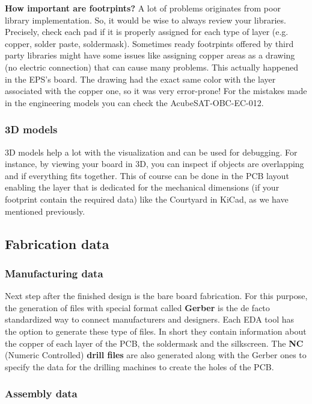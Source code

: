 \documentclass[final]{cubedoc}
\begin{document}
	
	
	\textbf{How important are footrpints?}
	A lot of problems originates from poor library implementation. So, it would be wise to always review your libraries. Precisely, check each pad if it is properly assigned for each type of layer (e.g. copper, solder paste, soldermask). Sometimes ready footrpints offered by third party libraries might have some issues like assigning copper areas as a drawing (no electric connection) that can cause many problems. This actually happened in the EPS's board. The drawing had the exact same color with the layer associated with the copper one, so it was very error-prone! For the mistakes made in the engineering models you can check the AcubeSAT-OBC-EC-012.
	
	
	\subsubsection{3D models}
	
	3D models help a lot with the visualization and can be used for debugging. For instance, by viewing your board in 3D, you can inspect if objects are overlapping and if everything fits together. This of course can be done in the PCB layout enabling the layer that is dedicated for the mechanical dimensions (if your footprint contain the required data) like the Courtyard in KiCad, as we have mentioned previously.
	
	\subsection{Fabrication data}
	
	\subsubsection{Manufacturing data}
	
	Next step after the finished design is the bare board fabrication. For this purpose, the generation of files with special format called \textbf{Gerber} is the de facto standardized way to connect manufacturers and designers. Each EDA tool has the option to generate these type of files. In short they contain information about the copper of each layer of the PCB, the soldermask and the silkscreen. The \textbf{NC} (Numeric Controlled) \textbf{drill files} are also generated along with the Gerber ones to specify the data for the drilling machines to create the holes of the PCB.
	
	
	\subsubsection{Assembly data}
	
\end{document}
